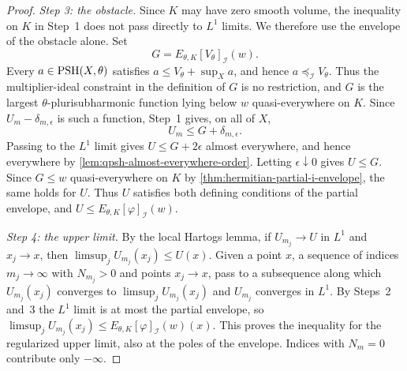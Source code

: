 \begin{proof}
\emph{Step 3: the obstacle.} Since $K$ may have zero smooth volume, the inequality on $K$ in Step~1 does not pass directly to $L^1$ limits. We therefore use the envelope of the obstacle alone. Set
\[
 G=E_{\theta,K}[V_\theta]_{\mathcal I}(w).
\]
Every $a\in\mathrm{PSH}(X,\theta)$ satisfies $a\leq V_\theta+\sup_Xa$, and hence $a\preceq_{\mathcal I}V_\theta$. Thus the multiplier-ideal constraint in the definition of $G$ is no restriction, and $G$ is the largest $\theta$-plurisubharmonic function lying below $w$ quasi-everywhere on $K$. Since $U_m-\delta_{m,\epsilon}$ is such a function, Step~1 gives, on all of $X$,
\[
 U_m\leq G+\delta_{m,\epsilon}.
\]
Passing to the $L^1$ limit gives $U\leq G+2\epsilon$ almost everywhere, and hence everywhere by \cref{lem:qpsh-almost-everywhere-order}. Letting $\epsilon\downarrow0$ gives $U\leq G$. Since $G\leq w$ quasi-everywhere on $K$ by \cref{thm:hermitian-partial-i-envelope}, the same holds for $U$. Thus $U$ satisfies both defining conditions of the partial envelope, and $U\leq E_{\theta,K}[\varphi]_{\mathcal I}(w)$.

\emph{Step 4: the upper limit.} By the local Hartogs lemma, if $U_{m_j}\to U$ in $L^1$ and $x_j\to x$, then $\limsup_jU_{m_j}(x_j)\leq U(x)$. Given a point $x$, a sequence of indices $m_j\to\infty$ with $N_{m_j}>0$ and points $x_j\to x$, pass to a subsequence along which $U_{m_j}(x_j)$ converges to $\limsup_jU_{m_j}(x_j)$ and $U_{m_j}$ converges in $L^1$. By Steps~2 and~3 the $L^1$ limit is at most the partial envelope, so $\limsup_jU_{m_j}(x_j)\leq E_{\theta,K}[\varphi]_{\mathcal I}(w)(x)$. This proves the inequality for the regularized upper limit, also at the poles of the envelope. Indices with $N_m=0$ contribute only $-\infty$.
\end{proof}
